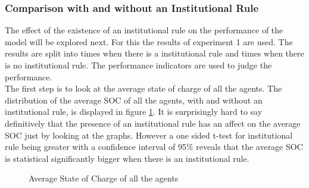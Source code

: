 \documentclass[a4paper]{article}
\begin{document}
\newpage
\subsubsection{Comparison with and without an Institutional Rule}
The effect of the existence of an institutional rule on the performance of the model will be explored next. For 
this the results of experiment 1 are used. The results are split into times when there is a institutional rule and 
times when there is no institutional rule. The performance indicators are used to judge the performance. \\

The first step is to look at the average state of charge of all the agents. The distribution of the average SOC of all
the agents, with and without an institutional rule, is displayed in figure \ref{inst_averages_all_second}. It is surprisingly hard 
to say definitively that the presence of an institutional rule has an affect on the average SOC just by looking at the graphs.
However a one sided t-test for institutional rule being greater with a confidence interval of 95\% reveals that the average 
SOC is statistical significantly bigger when there is an institutional rule.
\begin{figure}[!ht]
\caption{Average State of Charge of all the agents}
\label{inst_averages_all_second}
\end{figure}
\end{document}
